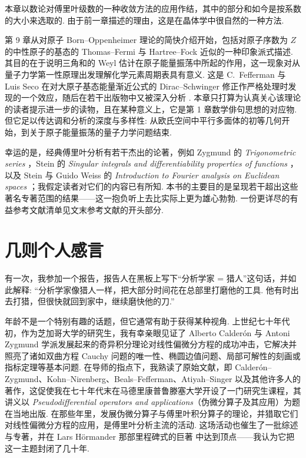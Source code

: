 本章以数论对傅里叶级数的一种收敛方法的应用作结，其中的部分和如今是按系数的大小来选取的. 由于前一章描述的理由，这是在晶体学中很自然的一种方法.

第 9 章从对原子 Born--Oppenheimer 理论的简快介绍开始，包括对原子序数为 $Z$ 的中性原子的基态的 Thomas--Fermi 与 Hartree--Fock 近似的一种印象派式描述. 其目的在于说明三角和的 Weyl 估计在原子能量振荡中所起的作用，这一现象对从量子力学第一性原理出发理解化学元素周期表具有意义. 这是 C.~Fefferman 与 Luis Seco \cite{b206} 在对大原子基态能量渐近公式的 Dirac--Schwinger 修正作严格处理时发现的一个效应，随后在若干出版物中又被深入分析 \cite{b200,b201,b207,b209,b223}. 本章只打算为认真关心该理论的读者提示进一步的读物，且在某种意义上，它是第 1 章数学俳句思想的对应物. 但它足以传达调和分析的深度与多样性: 从欧氏空间中平行多面体的初等几何开始，到关于原子能量振荡的量子力学问题结束.

幸运的是，经典傅里叶分析有若干杰出的论著，例如 Zygmund 的 \emph{Trigonometric series} \cite{b17}，Stein 的 \emph{Singular integrals and differentiability properties of functions} \cite{b12}，以及 Stein 与 Guido Weiss 的 \emph{Introduction to Fourier analysis on Euclidean spaces} \cite{b14}；我假定读者对它们的内容已有所知. 本书的主要目的是呈现若干超出这些著名专著范围的结果——这一抱负听上去比实际上更为雄心勃勃. 一份更详尽的有益参考文献清单见文末参考文献的开头部分.

\section*{几则个人感言}

有一次，我参加一个报告，报告人在黑板上写下``分析学家 = 猎人''这句话，并如此解释: ``分析学家像猎人一样，把大部分时间花在总部里打磨他的工具. 他有时出去打猎，但很快就回到家中，继续磨快他的刀.''

年龄不是一个特别有趣的话题，但它通常有助于获得某种视角. 上世纪七十年代初，作为芝加哥大学的研究生，我有幸亲眼见证了 Alberto Calderón 与 Antoni Zygmund 学派发展起来的奇异积分理论对线性偏微分方程的成功冲击，它解决并照亮了诸如双曲方程 Cauchy 问题的唯一性、椭圆边值问题、局部可解性的刻画或指标定理等基本问题. 在导师的指点下，我熟读了原始文献，即 Calderón--Zygmund、Kohn--Nirenberg、Beals--Fefferman、Atiyah--Singer 以及其他许多人的著作，这促使我在七十年代末在马德里康普鲁滕塞大学开设了一门研究生课程，其讲义以 \emph{Pseudodifferential operators and applications}（伪微分算子及其应用）为题在当地出版. 在那些年里，发展伪微分算子与傅里叶积分算子的理论，并猎取它们对线性偏微分方程的应用，是傅里叶分析主流的活动. 这场活动也催生了一批综述与专著，并在 Lars Hörmander 那部里程碑式的巨著 \cite{b8} 中达到顶点——我认为它把这一主题封闭了几十年.

